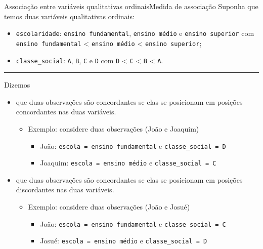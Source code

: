 \documentclass[
  10pt,
  ignorenonframetext,
]{beamer}
\providecommand{\tightlist}{%
  \setlength{\itemsep}{0pt}\setlength{\parskip}{0pt}}\usepackage{longtable,booktabs,array}
\newcommand*{\regrafina}{\rule{\textwidth}{0.5pt}}
\begin{document}
\begin{frame}[fragile]{Associação entre variáveis qualitativas
ordinais\newline Medida de associação}
\protect\hypertarget{associauxe7uxe3o-entre-variuxe1veis-qualitativas-ordinaismedida-de-associauxe7uxe3o}{}
Suponha que temos duas variáveis qualitativas ordinais:

\begin{itemize}
\tightlist
\item
  \texttt{escolaridade}: \texttt{ensino\ fundamental},
  \texttt{ensino\ médio} e \texttt{ensino\ superior} com
  \texttt{ensino\ fundamental} \textless{} \texttt{ensino\ médio}
  \textless{} \texttt{ensino\ superior};
\item
  \texttt{classe\_social}: \texttt{A}, \texttt{B}, \texttt{C} e
  \texttt{D} com \texttt{D} \textless{} \texttt{C} \textless{}
  \texttt{B} \textless{} \texttt{A}.
\end{itemize}

\regrafina

Dizemos

\begin{itemize}
\tightlist
\item
  que duas observações são concordantes se elas se posicionam em
  posições concordantes nas duas variáveis.

  \begin{itemize}
  \tightlist
  \item
    Exemplo: considere duas observações (João e Joaquim)

    \begin{itemize}
    \tightlist
    \item
      João: \texttt{escola\ =\ ensino\ fundamental} e
      \texttt{classe\_social\ =\ D}
    \item
      Joaquim: \texttt{escola\ =\ ensino\ médio} e
      \texttt{classe\_social\ =\ C}
    \end{itemize}
  \end{itemize}
\item
  que duas observações são concordantes se elas se posicionam em
  posições discordantes nas duas variáveis.

  \begin{itemize}
  \tightlist
  \item
    Exemplo: considere duas observações (João e Josué)

    \begin{itemize}
    \tightlist
    \item
      João: \texttt{escola\ =\ ensino\ fundamental} e
      \texttt{classe\_social\ =\ C}
    \item
      Josué: \texttt{escola\ =\ ensino\ médio} e
      \texttt{classe\_social\ =\ D}
    \end{itemize}
  \end{itemize}
\end{itemize}
\end{frame}
\end{document}

